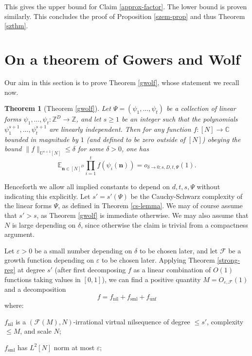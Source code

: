 \documentclass[11pt,reqno]{amsart}
\numberwithin{equation}{section}
\theoremstyle{plain}
\newtheorem{theorem}[subsection]{Theorem}
\theoremstyle{definition}
\renewcommand{\leq}{\leqslant}
\renewcommand{\geq}{\geqslant}
\newcommand\E{{\mathbb{E}}}
\newcommand\Z{\mathbb{Z}}
\newcommand\C{\mathbb{C}}
\newcommand\1{{\bf 1}}
\newcommand\2{{\bf 2}}
\newcommand\eps{\varepsilon}
\newcommand\nil{{\operatorname{nil}}}
\newcommand\sml{{\operatorname{sml}}}
\newcommand\unf{{\operatorname{unf}}}
\newcommand\Grow{{\mathcal F}}
\begin{document}
This gives the upper bound for Claim \ref{approx-factor}.  The lower bound is proven similarly.  This concludes the proof of Proposition \ref{szem-prop} and thus Theorem \ref{szthm}.

\section{On a theorem of Gowers and Wolf}\label{gowers-wolf-sec}

Our aim in this section is to prove Theorem \ref{gwolf}, whose statement we recall now. 

\begin{theorem}[Theorem \ref{gwolf}]  Let $\Psi = (\psi_1,\ldots,\psi_t)$ be a collection of linear forms $\psi_1,\ldots,\psi_t: \Z^D \to \Z$, and let $s \geq 1$ be an integer such that the polynomials $\psi_1^{s+1},\ldots,\psi_t^{s+1}$ are linearly independent.  Then for any function $f: [N] \to \C$ bounded in magnitude by $1$ \textup{(}and defined to be zero outside of $[N]$\textup{)} obeying the bound $\|f\|_{U^{s+1}[N]} \leq \delta$ for some $\delta > 0$, one has
$$ \E_{\mathbf{n}  \in [N]^D} \prod_{i=1}^t f( \psi_i(\mathbf{n}) ) = o_{\delta \to 0; s, D,t,\Psi}(1).$$
\end{theorem}

Henceforth we allow all implied constants to depend on $d,t,s,\Psi$ without indicating this explicitly. Let $s' = s'(\Psi)$ be the Cauchy-Schwarz complexity of the linear forms $\Psi$, as defined in Theorem \ref{cs-lemma}. We may of course assume that $s'>s$, as Theorem \ref{gwolf} is immediate otherwise. We may also assume that $N$ is large depending on $\delta$, since otherwise the claim is trivial from a compactness argument.

Let $\eps > 0$ be a small number depending on $\delta$ to be chosen later, and let $\Grow$ be a growth function depending on $\eps$ to be chosen later.  Applying  Theorem \ref{strong-reg} at degree $s'$ (after first decomposing $f$ as a linear combination of $O(1)$ functions taking values in $[0,1]$), we can find a positive quantity $M = O_{\eps,\Grow}(1)$ and a decomposition
\begin{equation}\label{fdecomp}
f = f_\nil + f_\sml + f_\unf
\end{equation}
where:

$f_\nil$ is a $(\Grow(M),N)$-irrational virtual nilsequence of degree $\leq s'$, complexity $\leq M$, and scale $N$;

$f_\sml$ has $L^2[N]$ norm at most $\eps$;
\end{document}
